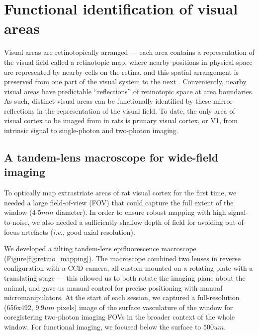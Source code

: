 \section{Functional identification of visual areas}
Visual areas are retinotopically arranged --- each area contains a representation of the visual field called a retinotopic map, where nearby positions in physical space are represented by nearby cells on the retina, and this spatial arrangement is preserved from one part of the visual system to the next \cite{REFREF}. Conveniently, nearby visual areas have predictable ``reflections'' of retinotopic space at area boundaries. As such, distinct visual areas can be functionally identified by these mirror reflections in the representation of the visual field. To date, the only area of visual cortex to be imaged from in rats is primary visual cortex, or V1, from intrinsic signal \cite{Gias2004} to single-photon \cite{Scott2018ImagingMacroscope} and two-photon \cite{Ohki2005, Greenberg2008} imaging.

\subsection{A tandem-lens macroscope for wide-field imaging}
To optically map extrastriate areas of rat visual cortex for the first time, we needed a large field-of-view (FOV) that could capture the full extent of the window (4-5$mm$ diameter). In order to ensure robust mapping with high signal-to-noise, we also needed a sufficiently shallow depth of field for avoiding out-of-focus artefacts (\textit{i.e.}, good axial resolution). 

We developed a tilting tandem-lens epifluorescence macroscope\cite{Ratzlaff1991}  (Figure\ref{fig:retino_mapping}). The macroscope combined two lenses in reverse configuration with a CCD camera, all custom-mounted on a rotating plate with a translating stage --- this allowed us to both rotate the imaging plane about the animal, and gave us manual control for precise positioning with manual micromanipulators. At the start of each session, we captured a full-resolution (656x492, $9.9um$ pixels) image of the surface vasculature of the window for coregistering two-photon imaging FOVs in the broader context of the whole window. For functional imaging, we focused below the surface to $500um$. 

